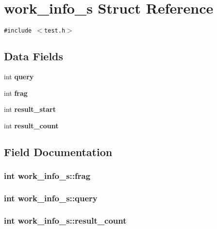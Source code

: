 \section{work\_\-info\_\-s Struct Reference}
\label{structwork__info__s}
{\tt \#include $<$test.h$>$}

\subsection*{Data Fields}
\begin{CompactItemize}
\item 
int \bf{query}
\item 
int \bf{frag}
\item 
int \bf{result\_\-start}
\item 
int \bf{result\_\-count}
\end{CompactItemize}


\subsection{Field Documentation}
\subsubsection{\setlength{\rightskip}{0pt plus 5cm}int \bf{work\_\-info\_\-s::frag}}\label{structwork__info__s_505ebdd43d735e673b4c37916dee7d7d}


\subsubsection{\setlength{\rightskip}{0pt plus 5cm}int \bf{work\_\-info\_\-s::query}}\label{structwork__info__s_f72c69165d8886f415ccf036947c6cf6}


\subsubsection{\setlength{\rightskip}{0pt plus 5cm}int \bf{work\_\-info\_\-s::result\_\-count}}\label{structwork__info__s_8bf32afe566b6a52b265498694b28821}


